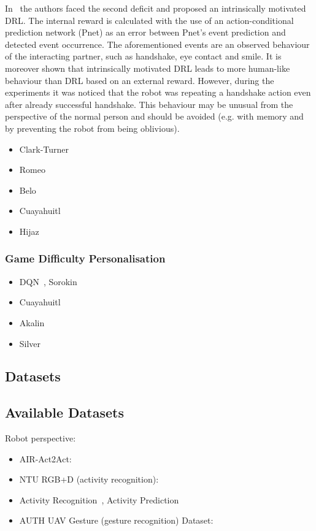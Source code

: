 \documentclass[thesis]{mas_proposal}
\begin{document}
In~\cite{Qureshi2018} the authors faced the second deficit and proposed an intrinsically motivated DRL. The internal reward is calculated with the use of an action-conditional prediction network (Pnet) as an error between Pnet's event prediction and detected event occurrence. The aforementioned events are an observed behaviour of the interacting partner, such as handshake, eye contact and smile. It is moreover shown that intrinsically motivated DRL leads to more human-like behaviour than DRL based on an external reward. However, during the experiments it was noticed that the robot was repeating a handshake action even after already successful handshake. This behaviour may be unusual from the perspective of the normal person and should be avoided (e.g. with memory and by preventing the robot from being oblivious).
 
\begin{itemize}
	\item Clark-Turner~\cite{ClarkTurner2017,Turner2018}
	\item Romeo~\cite{Romeo2018,Romeo2019,romeo2021human}
	\item Belo~\cite{Belo2021,Belo2022}
	\item Cuayahuitl~\cite{Cuayahuitl2017}
	\item Hijaz~\cite{Hijaz2021}
\end{itemize}

\subsubsection{Game Difficulty Personalisation}

\begin{itemize}
	\item DQN~\cite{mnih2015human}, Sorokin~\cite{sorokin2015deep}
	\item Cuayahuitl~\cite{Cuayahuitl2020}
	\item Akalin~\cite{Akalin2018}
	\item Silver~\cite{Silver2016}
\end{itemize}

\subsection{Datasets}
\subsection{Available Datasets}

Robot perspective:
\begin{itemize}
	\item AIR-Act2Act: \cite{Ko2021}
	\item NTU RGB+D (activity recognition): \cite{Liu2020,Shahroudy_2016_CVPR}
	\item Activity Recognition~\cite{ryoo2013firstperson}, Activity Prediction~\cite{ryoo2015robot}
	\item AUTH UAV Gesture (gesture recognition) Dataset:~\cite{patrona2021overview,Liu2020,Perera_2018_ECCV_Workshops}
\end{itemize}
\end{document}
